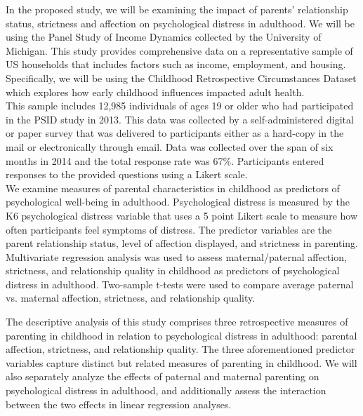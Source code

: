 \documentclass[12pt,letterpaper]{article}
\begin{document}

\begin{center}
\end{center}

\indent In the proposed study, we will be examining the impact of parents' relationship status, strictness and affection on psychological distress in adulthood. We will be using the Panel Study of Income Dynamics collected by the University of Michigan. This study provides comprehensive data on a representative sample of US households that includes factors such as income, employment, and housing. Specifically, we will be using the Childhood Retrospective Circumstances Dataset which explores how early childhood influences impacted adult health. \\
\indent This sample includes 12,985 individuals of ages 19 or older who had participated in the PSID study in 2013. This data was collected by a self-administered digital or paper survey that was delivered to participants either as a hard-copy in the mail or electronically through email. Data was collected over the span of six months in 2014 and the total response rate was 67\%. Participants entered responses to the provided questions using a Likert scale. \\
\indent We examine measures of parental characteristics in childhood as predictors of psychological well-being in adulthood. Psychological distress is measured by the K6 psychological distress variable that uses a 5 point Likert scale to measure how often participants feel symptoms of distress. The predictor variables are the parent relationship status, level of affection displayed, and strictness in parenting. \\
\indent Multivariate regression analysis was used to assess maternal/paternal affection, strictness, and relationship quality in childhood as predictors of psychological distress in adulthood.  Two-sample t-tests were used to compare average paternal vs. maternal affection, strictness, and relationship quality. 


\begin{center}
\end{center}

The descriptive analysis of this study comprises three retrospective measures of parenting in childhood in relation to psychological distress in adulthood: parental affection, strictness, and relationship quality. The three aforementioned predictor variables capture distinct but related measures of parenting in childhood. We will also separately analyze the effects of paternal and maternal parenting on psychological distress in adulthood, and additionally assess the interaction between the two effects in linear regression analyses.  
\end{document}
